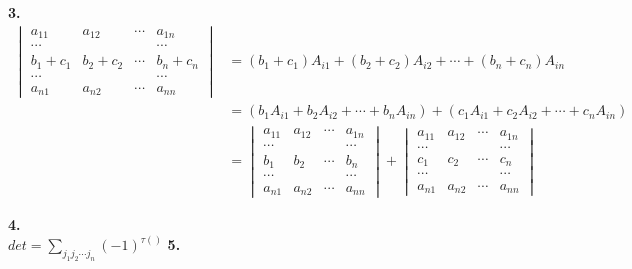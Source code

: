 \documentclass{article}
\theoremstyle{definition}
\begin{document}
\textbf{3.}
\begin{align*}
\begin{vmatrix}
    a_{11} & a_{12} & \cdots & a_{1n}\\
    \cdots &  &  & \cdots\\
    b_{1}+c_{1} & b_{2}+c_{2} & \cdots & b_{n}+c_{n}\\
    \cdots &  &  & \cdots\\
    a_{n1} & a_{n2} & \cdots & a_{nn}
\end{vmatrix}
& = (b_{1}+c_{1})A_{i1} + (b_{2}+c_{2})A_{i2} + \cdots + (b_{n}+c_{n})A_{in} \\
& = (b_{1}A_{i1} + b_{2}A_{i2} + \cdots + b_{n}A_{in}) + (c_{1}A_{i1} + c_{2}A_{i2} + \cdots + c_{n}A_{in}) \\
& = \begin{vmatrix}
    a_{11} & a_{12} & \cdots & a_{1n}\\
    \cdots &  &  & \cdots\\
    b_{1} & b_{2} & \cdots & b_{n}\\
    \cdots &  &  & \cdots\\
    a_{n1} & a_{n2} & \cdots & a_{nn}
\end{vmatrix}
+ \begin{vmatrix}
    a_{11} & a_{12} & \cdots & a_{1n}\\
    \cdots &  &  & \cdots\\
    c_{1} & c_{2} & \cdots & c_{n}\\
    \cdots &  &  & \cdots\\
    a_{n1} & a_{n2} & \cdots & a_{nn}
\end{vmatrix}
\end{align*}

\textbf{4.}\\
$det = \sum_{j_{1}j_{2}\cdots j_{n}}(-1)^{\tau ()}$
\textbf{5.}\\
\end{document}
